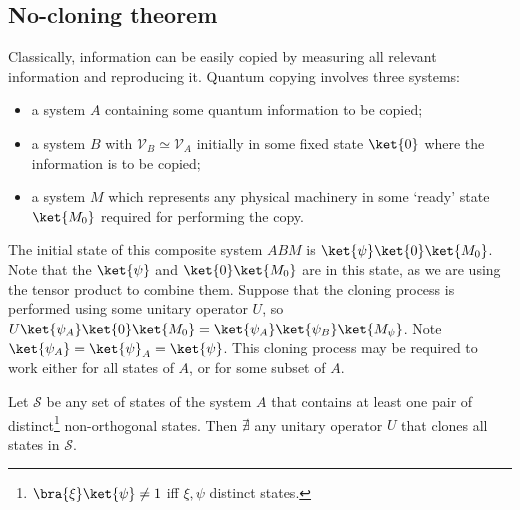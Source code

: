 \subsection{No-cloning theorem}
Classically, information can be easily copied by measuring all relevant information and reproducing it.
Quantum copying involves three systems:
\begin{itemize}
    \item a system $A$ containing some quantum information to be copied;
    \item a system $B$ with $\mathcal V_B \simeq \mathcal V_A$ initially in some fixed state $\ket{0}$ where the information is to be copied;
    \item a system $M$ which represents any physical machinery in some `ready' state $\ket{M_0}$ required for performing the copy.
\end{itemize}
The initial state of this composite system $ABM$ is $\ket{\psi} \ket{0} \ket{M_0}$.
Note that the $\ket{\psi}$ and $\ket{0}\ket{M_0}$ are  in this state, as we are using the tensor product to combine them.
Suppose that the cloning process is performed using some unitary operator $U$, so $U\ket{\psi_A}\ket{0}\ket{M_0} = \ket{\psi_A}\ket{\psi_B}\ket{M_\psi}$.
Note $\ket{\psi_A} = \ket{\psi}_A = \ket{\psi}$.
This cloning process may be required to work either for all states of $A$, or for some subset of $A$.
\begin{theorem}
    Let $\mathcal S$ be any set of states of the system $A$ that contains at least one pair of distinct\footnote{$\bra{\xi}\ket{\psi} \neq 1$ iff $\xi, \psi$ distinct states.} non-orthogonal states.
    Then $\nexists$ any unitary operator $U$ that clones all states in $\mathcal S$.
\end{theorem}

